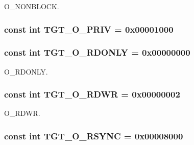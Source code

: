 O\_\-NONBLOCK. \hypertarget{classSparcSolaris_adbc0cc4c9a567197eb9ad74887a978cc}{
\subsubsection[{TGT\_\-O\_\-PRIV}]{\setlength{\rightskip}{0pt plus 5cm}const int {\bf TGT\_\-O\_\-PRIV} = 0x00001000}}
\label{classSparcSolaris_adbc0cc4c9a567197eb9ad74887a978cc}
\hypertarget{classSparcSolaris_ad266b23a0ae07d1833e18bae651f3411}{
\subsubsection[{TGT\_\-O\_\-RDONLY}]{\setlength{\rightskip}{0pt plus 5cm}const int {\bf TGT\_\-O\_\-RDONLY} = 0x00000000}}
\label{classSparcSolaris_ad266b23a0ae07d1833e18bae651f3411}


O\_\-RDONLY. \hypertarget{classSparcSolaris_ac6fa9ecf5d2f3314f197698f1099e2ac}{
\subsubsection[{TGT\_\-O\_\-RDWR}]{\setlength{\rightskip}{0pt plus 5cm}const int {\bf TGT\_\-O\_\-RDWR} = 0x00000002}}
\label{classSparcSolaris_ac6fa9ecf5d2f3314f197698f1099e2ac}


O\_\-RDWR. \hypertarget{classSparcSolaris_a1b4245158ffbfdc36ae7d6e666ffc261}{
\subsubsection[{TGT\_\-O\_\-RSYNC}]{\setlength{\rightskip}{0pt plus 5cm}const int {\bf TGT\_\-O\_\-RSYNC} = 0x00008000}}
\label{classSparcSolaris_a1b4245158ffbfdc36ae7d6e666ffc261}


